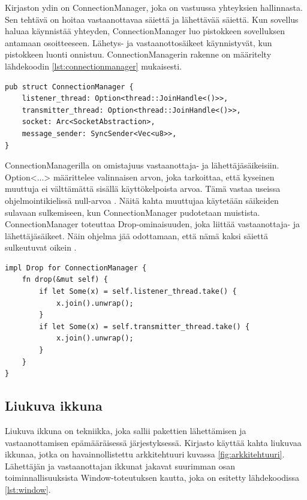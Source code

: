 \documentclass[a4paper,12pt]{article}
\begin{document}
    Kirjaston ydin on ConnectionManager, joka on vastuussa yhteyksien hallinnasta. Sen tehtävä on
    hoitaa vastaanottavaa säiettä ja lähettävää säiettä. Kun sovellus haluaa käynnistää yhteyden,
    ConnectionManager luo pistokkeen sovelluksen antamaan osoitteeseen.
    Lähetys- ja vastaanottosäikeet käynnistyvät, kun pistokkeen luonti onnistuu. ConnectionManagerin rakenne on määritelty lähdekoodin \ref{lst:connectionmanager} mukaisesti.
    
    \begin{lstlisting}[caption={ConnectionManagerin rakenne}, label={lst:connectionmanager}]
pub struct ConnectionManager {
    listener_thread: Option<thread::JoinHandle<()>>,
    transmitter_thread: Option<thread::JoinHandle<()>>,
    socket: Arc<SocketAbstraction>,
    message_sender: SyncSender<Vec<u8>>,
}\end{lstlisting}

    

    ConnectionManagerilla on omistajuus vastaanottaja- ja lähettäjäsäikeisiin.
    Option<...> määrittelee valinnaisen arvon, joka tarkoittaa, että kyseinen muuttuja ei
    välttämättä sisällä käyttökelpoista arvoa. Tämä vastaa useissa ohjelmointikielissä null-arvoa \cite[luku 6.1]{rust-book}. Näitä kahta muuttujaa käytetään säikeiden sulavaan sulkemiseen, kun ConnectionManager pudotetaan muistista. ConnectionManager toteuttaa Drop-ominaisuuden, joka liittää vastaanottaja-
    ja lähettäjäsäikeet. Näin ohjelma jää odottamaan, että nämä kaksi säiettä sulkeutuvat oikein \cite[\textit{JoinHandle}]{rust-std}.
    
    \architecture
    

    \begin{lstlisting}[caption={Drop-ominaisuuden toteutus ConnectionManagerille}, label={lst:connectionmanager_drop}]
impl Drop for ConnectionManager {
    fn drop(&mut self) {
        if let Some(x) = self.listener_thread.take() {
            x.join().unwrap();
        }
        if let Some(x) = self.transmitter_thread.take() {
            x.join().unwrap();
        }
    }
}\end{lstlisting}



    \subsection{Liukuva ikkuna}\label{sec:liukuva_ikkuna}
    Liukuva ikkuna on tekniikka, joka sallii pakettien lähettämisen ja vastaanottamisen epämääräisessä järjestyksessä. 
    Kirjasto käyttää kahta liukuvaa ikkunaa, jotka on havainnollistettu arkkitehtuuri kuvassa \ref{fig:arkkitehtuuri}. Lähettäjän ja vastaanottajan ikkunat jakavat suurimman osan toiminnallisuuksista Window-toteutuksen kautta, joka on esitetty lähdekoodissa \ref{lst:window}. 
\end{document}
